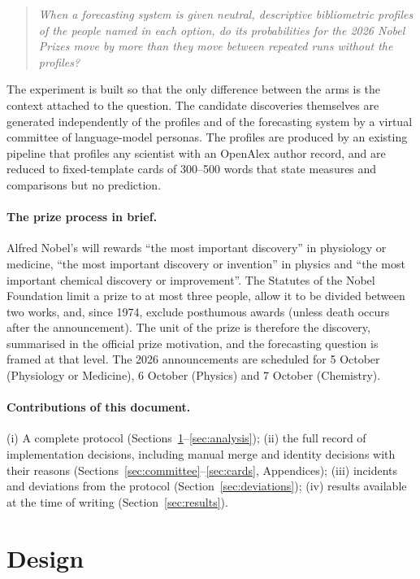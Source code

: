 \documentclass[11pt]{article}
\begin{document}
\begin{quote}
\emph{When a forecasting system is given neutral, descriptive bibliometric profiles of the people named in each option,
do its probabilities for the 2026 Nobel Prizes move by more than they move between repeated runs without the
profiles?}
\end{quote}

The experiment is built so that the only difference between the arms is the context attached to the question. The
candidate discoveries themselves are generated independently of the profiles and of the forecasting system by a
virtual committee of language-model personas. The profiles are produced by an existing pipeline that profiles any
scientist with an OpenAlex author record, and are reduced to fixed-template cards of 300--500 words that state
measures and comparisons but no prediction.

\paragraph{The prize process in brief.} Alfred Nobel's will rewards ``the most important discovery'' in physiology or
medicine, ``the most important discovery or invention'' in physics and ``the most important chemical discovery or
improvement''. The Statutes of the Nobel Foundation limit a prize to at most three people, allow it to be divided
between two works, and, since 1974, exclude posthumous awards (unless death occurs after the announcement). The unit
of the prize is therefore the discovery, summarised in the official prize motivation, and the forecasting question is
framed at that level. The 2026 announcements are scheduled for 5 October (Physiology or Medicine), 6 October (Physics)
and 7 October (Chemistry).

\paragraph{Contributions of this document.} (i) A complete protocol (Sections~\ref{sec:design}--\ref{sec:analysis});
(ii) the full record of implementation decisions, including manual merge and identity decisions with their reasons
(Sections~\ref{sec:committee}--\ref{sec:cards}, Appendices); (iii) incidents and deviations from the protocol
(Section~\ref{sec:deviations}); (iv) results available at the time of writing (Section~\ref{sec:results}).
\section{Design}\label{sec:design}
\end{document}
